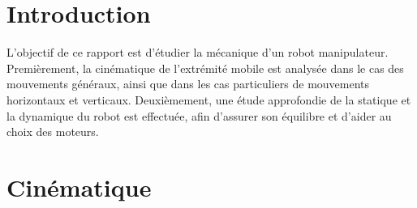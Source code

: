 \documentclass{udes_rapport} %
\begin{document}




\newpage

\tableofcontents
\newpage


\listoffigures
\newpage



\setcounter{page}{1} %
\section{Introduction}

L'objectif de ce rapport est d'étudier la mécanique d'un robot manipulateur. Premièrement, la cinématique de l'extrémité mobile est analysée dans le cas des mouvements généraux, ainsi que dans les cas particuliers de mouvements horizontaux et verticaux. Deuxièmement, une étude approfondie de la statique et la dynamique du robot est effectuée, afin d'assurer son équilibre et d'aider au choix des moteurs.

\section{Cinématique}
\end{document}
